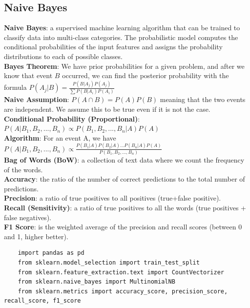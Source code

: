 \documentclass[11pt, a4paper]{article}
\begin{document}
\begin{spacing}{1.1}
	\subsection{Naive Bayes}
	\textbf{Naive Bayes}: a supervised machine learning algorithm that can be trained to classify data into multi-class categories. The probabilistic model computes the conditional probabilities of the input features and assigns the probability distributions to each of possible classes. \vspace*{2mm}\\
	\textbf{Bayes Theorem}: We have prior probabilities for a given problem, and after we know that event $B$ occurred, we can find the posterior probability with the formula $ P(A_j|B) = \frac{P(B|A_j)P(A_j)}{\sum P(B|A_i)P(A_i)}$\vspace*{2mm}\\
	\textbf{Naive Assumption}: $P(A\cap B) = P(A)P(B)$ meaning that the two events are independent. We assume this to be true even if it is not the case. \vspace*{2mm}\\
	\textbf{Conditional Probability (Proportional)}: $P(A|B_1,B_2,...,B_n) \propto P(B_1,B_2,...,B_n|A)P(A)$\vspace*{2mm}\\
	\textbf{Algorithm}: For an event A, we have $ P(A|B_1,B_2,...,B_n) \propto \frac{P(B_1|A)P(B_2|A)...P(B_n|A)P(A)}{P(B_1,B_2,...,B_n)}$  \vspace*{2mm}\\
	\textbf{Bag of Words (BoW)}: a collection of text data where we count the frequency of the words. \vspace*{2mm}\\
	\textbf{Accuracy}: the ratio of the number of correct predictions to the total number of predictions.\vspace*{2mm}\\
	\textbf{Precision}: a ratio of true positives to all positives (true+false positive).\vspace*{2mm}\\
	\textbf{Recall (Sensitivity)}: a ratio of true positives to all the words (true positives + false negatives).\vspace*{2mm}\\
	\textbf{F1 Score}:  is the weighted average of the precision and recall scores (between 0 and 1, higher better).
	\begin{lstlisting}
	import pandas as pd
	from sklearn.model_selection import train_test_split
	from sklearn.feature_extraction.text import CountVectorizer
	from sklearn.naive_bayes import MultinomialNB
	from sklearn.metrics import accuracy_score, precision_score, recall_score, f1_score
	

\end{lstlisting}
\end{spacing}
\end{document}
